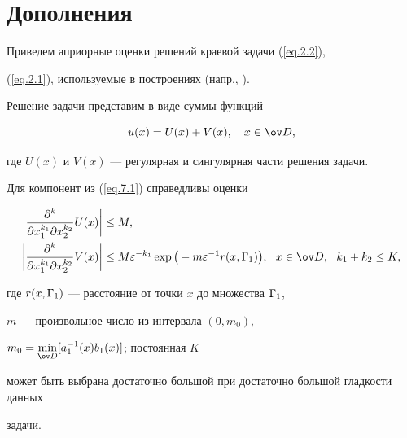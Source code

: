 \section{Дополнения}


\label{section.7}





Приведем априорные оценки решений краевой задачи (\ref{eq.2.2}),


(\ref{eq.2.1}), используемые в построениях (напр., \cite{6}).





Решение задачи представим в виде суммы функций


\begin{equation} \label{eq.7.1}


u(x) = U(x) + V(x),\quad x \in \od ,


\end{equation}


где $U(x)$ и $V(x)$ --- регулярная и сингулярная части решения задачи.


Для компонент из (\ref{eq.7.1}) справедливы оценки


\begin{equation} \label{eq.7.2}


\begin{split}


\bigg|\frac{\pad^k}{\pad x^{k_1}_1 \pad


x^{k_2}_2}U(x)\bigg|&\leq M, \\


%


\bigg|\frac{\pad^k}{\pad x^{k_1}_1 \pad x^{k_2}_2}V(x)\bigg|&\leq M


\eps^{-k_1} \exp\big(-m \eps^{-1} r(x,\G_1)\big),\ \ x \in \od,\ \


k_1+k_2 \leq K,


\end{split}


\end{equation}


где $r(x,\Gamma_1)$ --- расстояние от точки $x$ до множества $\Gamma_1$,


$m$ --- произвольное число из интервала $(0,m_0)$, 


$m_0 = \min\limits_{\od}[a^{-1}_1(x)b_1(x)]$; постоянная $K$


может быть выбрана достаточно большой при достаточно большой гладкости данных


задачи.






